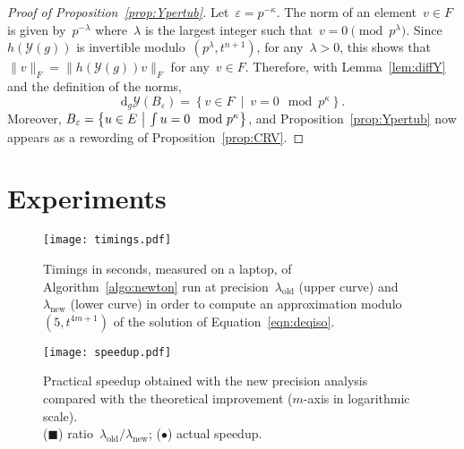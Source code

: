 \documentclass{sig-alternate}
\theoremstyle{definition}
\theoremstyle{remark}
\newcommand\cY{\mathcal{Y}}
\newcommand{\ud}{\mathrm{d}}
\def\st{\ \middle|\ }
\def\smallint{\begingroup\textstyle \int\endgroup}
\begin{document}
\begin{proof}
  [Proof of Proposition~\ref{prop:Ypertub}]
  Let~$\varepsilon = p^{-\kappa}$.
  The norm of an element~$v\in F$ is given by~$p^{-\lambda}$
  where~$\lambda$ is the largest integer such that~$v = 0\pmod{p^\lambda}$.
  Since~$h(\cY(g))$ is invertible modulo~$(p^{\lambda}, t^{n+1})$, for any~$\lambda>0$,
  this shows that~$\|v\|_F = \|h(\cY(g)) v\|_F$ for any~$v\in F$.
  Therefore, with Lemma~\ref{lem:diffY} and the definition of the norms,
  \[ \ud_g\cY(B_\varepsilon) = \left\{ v \in F \st v = 0 \mod p^\kappa \right\}. \]
  Moreover, $B_\varepsilon = \left\{ u \in E \st \smallint u = 0 \mod{p^\kappa} \right\}$,
  and Proposition~\ref{prop:Ypertub} now appears as a rewording of Proposition~\ref{prop:CRV}.
\end{proof}



\section{Experiments}
\label{sec:implementation-equa-diff}



\begin{figure}[t]
  \begin{center}
    \texttt{[image: timings.pdf]}
  \end{center}
  \caption{Timings in seconds, measured on a laptop, of Algorithm~\ref{algo:newton} run at precision~$\lambda_\text{old}$ (upper curve) and~$\lambda_\text{new}$ (lower curve) in order to compute an approximation modulo~$(5,t^{4m+1})$ of the solution of Equation~\eqref{eqn:deqiso}.}
  \label{fig:timings}
\end{figure}

\begin{figure}[t]
  \begin{center}
    \texttt{[image: speedup.pdf]}
  \end{center}
  \caption{ {Practical speedup obtained with the new precision analysis compared with the theoretical improvement ($m$-axis in logarithmic scale).\\
    ({\tiny $\blacksquare$}) ratio~$\lambda_\text{old}/\lambda_\text{new}$; ($\bullet$) actual speedup.
  } }
  \label{fig:speedup}
\end{figure}
\end{document}
